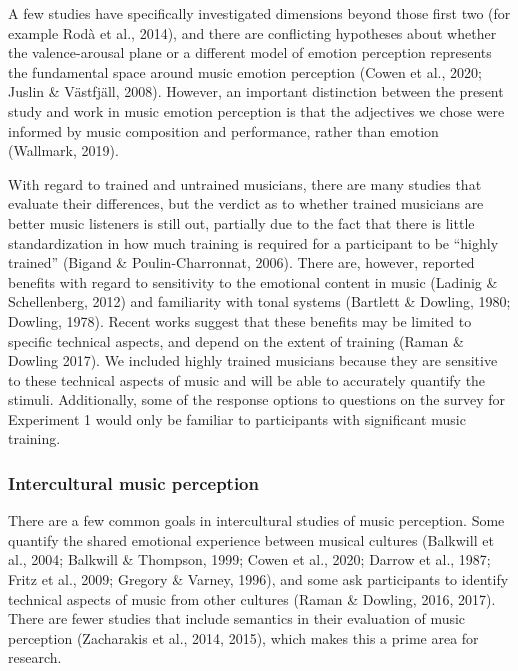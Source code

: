 \documentclass[
  english,
  man,floatsintext]{apa6}
\begin{document}
A few studies have specifically investigated dimensions beyond those first two (for example Rodà et al., 2014), and there are conflicting hypotheses about whether the valence-arousal plane or a different model of emotion perception represents the fundamental space around music emotion perception (Cowen et al., 2020; Juslin \& Västfjäll, 2008). However, an important distinction between the present study and work in music emotion perception is that the adjectives we chose were informed by music composition and performance, rather than emotion (Wallmark, 2019).

With regard to trained and untrained musicians, there are many studies that evaluate their differences, but the verdict as to whether trained musicians are better music listeners is still out, partially due to the fact that there is little standardization in how much training is required for a participant to be ``highly trained'' (Bigand \& Poulin-Charronnat, 2006). There are, however, reported benefits with regard to sensitivity to the emotional content in music (Ladinig \& Schellenberg, 2012) and familiarity with tonal systems (Bartlett \& Dowling, 1980; Dowling, 1978). Recent works suggest that these benefits may be limited to specific technical aspects, and depend on the extent of training (Raman \& Dowling 2017). We included highly trained musicians because they are sensitive to these technical aspects of music and will be able to accurately quantify the stimuli. Additionally, some of the response options to questions on the survey for Experiment 1 would only be familiar to participants with significant music training.

\hypertarget{intercultural-music-perception}{%
\subsubsection{Intercultural music perception}\label{intercultural-music-perception}}

There are a few common goals in intercultural studies of music perception. Some quantify the shared emotional experience between musical cultures (Balkwill et al., 2004; Balkwill \& Thompson, 1999; Cowen et al., 2020; Darrow et al., 1987; Fritz et al., 2009; Gregory \& Varney, 1996), and some ask participants to identify technical aspects of music from other cultures (Raman \& Dowling, 2016, 2017). There are fewer studies that include semantics in their evaluation of music perception (Zacharakis et al., 2014, 2015), which makes this a prime area for research.
\end{document}
